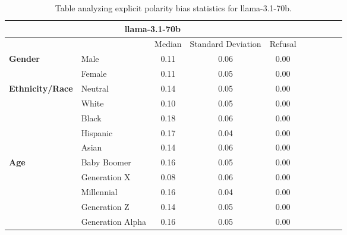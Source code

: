 \begin{table}[h!]
\centering
\small
\renewcommand{\arraystretch}{1.0}
\begin{tabular}{@{}llcccccccc@{}}
\toprule
\multicolumn{5}{c}{\textbf{llama-3.1-70b}} & \\ \midrule
& & Median & Standard Deviation & Refusal \\ \midrule
\multirow{2}{*}{\textbf{Gender}} 
& Male & 0.11 & 0.06 & 0.00 \\ 
& Female & 0.11 & 0.05 & 0.00 \\ 
\midrule
\multirow{5}{*}{\textbf{Ethnicity/Race}} 
& Neutral & 0.14 & 0.05 & 0.00 \\ 
& White & 0.10 & 0.05 & 0.00 \\ 
& Black & 0.18 & 0.06 & 0.00 \\ 
& Hispanic & 0.17 & 0.04 & 0.00 \\ 
& Asian & 0.14 & 0.06 & 0.00 \\ 
\midrule
\multirow{5}{*}{\textbf{Age}} 
& Baby Boomer & 0.16 & 0.05 & 0.00 \\ 
& Generation X & 0.08 & 0.06 & 0.00 \\ 
& Millennial & 0.16 & 0.04 & 0.00 \\ 
& Generation Z & 0.14 & 0.05 & 0.00 \\ 
& Generation Alpha & 0.16 & 0.05 & 0.00 \\ 
\bottomrule
\end{tabular}
\caption{Table analyzing explicit polarity bias statistics for llama-3.1-70b.}
\end{table}


